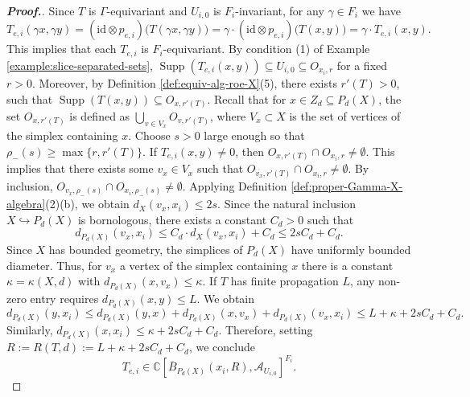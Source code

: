 \documentclass[pdflatex]{sn-jnl}
\theoremstyle{plain}
\theoremstyle{definition}
\begin{document}
\begin{proof}[\textbf{Proof.}]
Since $T$ is $\Gamma$-equivariant and $U_{i,0}$ is $F_i$-invariant, for any $\gamma\in F_i$ we have
\[T_{e,i}(\gamma x,\gamma y)=(\mathrm{id}\otimes p_{e,i})\bigl(T(\gamma x,\gamma y)\bigr)=\gamma\cdot (\mathrm{id}\otimes p_{e,i})\bigl(T(x,y)\bigr)=\gamma\cdot T_{e,i}(x,y).\]
This implies that each $T_{e,i}$ is $F_i$-equivariant. By condition (1) of Example \ref{example:slice-separated-sets}, 
$\operatorname{Supp}(T_{e,i}(x, y))\subseteq U_{i,0}\subseteq O_{x_i,r}$ for a fixed $r > 0$.
Moreover, by Definition \ref{def:equiv-alg-roe-X}(5), there exists $r'(T)>0$, such that
$\operatorname{Supp}(T(x, y))\subseteq O_{x,r'(T)}$.
Recall that for $x\in Z_{d}\subseteq P_{d}(X)$, the set $O_{x,r'(T)}$ is defined as $\bigcup_{v\in V_x} O_{v,r'(T)}$, where $V_x\subset X$ is the set of vertices of the simplex containing $x$. Choose $s>0$ large enough so that
$\rho_-(s)\geq\max\{r,r'(T)\}$.
If $T_{e,i}(x, y)\neq 0$, then
$O_{x,r'(T)}\cap O_{x_i,r}\neq\emptyset$.
This implies that there exists some $v_x\in V_x$ such that
$O_{v_x,r'(T)}\cap O_{x_i,r}\neq\emptyset$.
By inclusion,
$O_{v_x,\rho_-(s)}\cap O_{x_i,\rho_-(s)}\neq\emptyset$.
Applying Definition \ref{def:proper-Gamma-X-algebra}(2)(b), we obtain
$d_X(v_x, x_i)\leq 2s$. Since the natural inclusion $X\hookrightarrow P_{d}(X)$ is bornologous, there exists a constant $C_{d}>0$ such that
\[ d_{P_{d}(X)}(v_x, x_i)\leq C_{d}\cdot d_X(v_x, x_i)+C_{d}\leq 2sC_{d}+C_{d}.\]
Since $X$ has bounded geometry, the simplices of $P_{d}(X)$ have uniformly bounded diameter. Thus, for $v_x$ a vertex of the simplex containing $x$ there is a constant $\kappa=\kappa(X,d)$ with $d_{P_{d}(X)}(x,v_x)\leq\kappa$. If $T$ has finite propagation $L$, any non-zero entry requires $d_{P_{d}(X)}(x,y)\leq L$. We obtain \[d_{P_{d}(X)}(y, x_i)\leq d_{P_{d}(X)}(y,x)+d_{P_{d}(X)}(x,v_x)+d_{P_{d}(X)}(v_x,x_i)\leq L+\kappa+2sC_{d}+C_{d}.\] Similarly, $d_{P_{d}(X)}(x,x_i)\leq\kappa+2sC_{d}+C_{d}$. Therefore, setting $R:=R(T,d):=L+\kappa+2sC_{d}+C_{d}$, we conclude \[T_{e,i}\in\mathbb{C}[\overline{B}_{P_{d}(X)}(x_i,R),\mathcal{A}_{U_{i,0}}]^{F_i}.\]


\end{proof}
\end{document}
